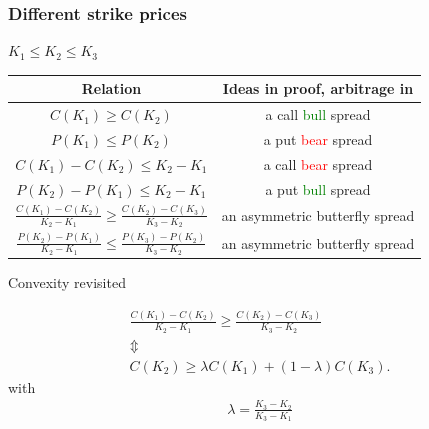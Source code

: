 \begin{frame}[fragile,t]
	\frametitle{Different strike prices}
	\begin{center}
		$ K_1\le K_2 \le K_3$\\
		\bigskip

		\renewcommand{\arraystretch}{2.5}
		\begin{tabular}{|c|c|}
			\hline
			Relation                                                                         & Ideas in proof, arbitrage in          \\ \hline
			$C(K_1) \ge C(K_2)$                                                              & a call \textcolor{green}{bull} spread \\
			$P(K_1) \le P(K_2)$                                                              & a put \textcolor{red}{bear} spread    \\ \hline
			$C(K_1)-C(K_2) \le K_2-K_1$                                                      & a call \textcolor{red}{bear} spread   \\
			$P(K_2)-P(K_1) \le K_2-K_1$                                                      & a put \textcolor{green}{bull} spread  \\ \hline
			$ \displaystyle \frac{C(K_1)-C(K_2)}{K_2-K_1} \ge \frac{C(K_2)-C(K_3)}{K_3-K_2}$ & an asymmetric butterfly spread        \\
			$ \displaystyle \frac{P(K_2)-P(K_1)}{K_2-K_1} \le \frac{P(K_3)-P(K_2)}{K_3-K_2}$ & an asymmetric butterfly spread        \\ \hline
		\end{tabular}
	\end{center}
\end{frame}
\begin{frame}[fragile,t]
\begin{center}
	Convexity revisited

	\begin{gather*}
		\frac{C(K_1)-C(K_2)}{K_2-K_1} \ge \frac{C(K_2)-C(K_3)}{K_3-K_2} \\[1em] \Updownarrow \\[1em]
		 C(K_2) \ge \lambda C(K_1) + (1-\lambda) C(K_3).
	\end{gather*}
	with
	\begin{align*}
		\lambda = \frac{K_3-K_2}{K_3-K_1}
	\end{align*}
\end{center}
\end{frame}
